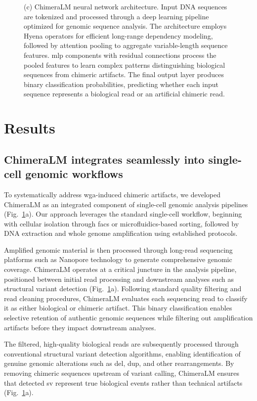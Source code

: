\documentclass[pdflatex,sn-nature]{sn-jnl}%
\theoremstyle{thmstyleone}%
\theoremstyle{thmstyletwo}%
\theoremstyle{thmstylethree}%
\begin{document}
\begin{figure}[!ht]
{		(c) ChimeraLM neural network architecture. Input DNA sequences are tokenized and processed through a deep learning pipeline optimized for genomic sequence analysis. The architecture employs Hyena operators for efficient long-range dependency modeling, followed by attention pooling to aggregate variable-length sequence features. \gls{mlp} components with residual connections process the pooled features to learn complex patterns distinguishing biological sequences from chimeric artifacts. The final output layer produces binary classification probabilities, predicting whether each input sequence represents a biological read or an artificial chimeric read.} \label{fig:figure1}
\end{figure}

\section*{Results}\label{sec:results}

\subsection*{ChimeraLM integrates seamlessly into single-cell genomic workflows}

To systematically address \gls{wga}-induced chimeric artifacts, we developed ChimeraLM as an integrated component of single-cell genomic analysis pipelines (Fig.~\ref{fig:figure1}a).
Our approach leverages the standard single-cell workflow, beginning with cellular isolation through \gls{facs} or microfluidics-based sorting, followed by DNA extraction and whole genome amplification using established protocols.

Amplified genomic material is then processed through long-read sequencing platforms such as Nanopore technology to generate comprehensive genomic coverage.
ChimeraLM operates at a critical juncture in the analysis pipeline, positioned between initial read processing and downstream analyses such as structural variant detection (Fig.~\ref{fig:figure1}a).
Following standard quality filtering and read cleaning procedures, ChimeraLM evaluates each sequencing read to classify it as either biological or chimeric artifact.
This binary classification enables selective retention of authentic genomic sequences while filtering out amplification artifacts before they impact downstream analyses.

The filtered, high-quality biological reads are subsequently processed through conventional structural variant detection algorithms, enabling identification of genuine genomic alterations such as \gls{del}, \gls{dup}, and other rearrangements.
By removing chimeric sequences upstream of variant calling, ChimeraLM ensures that detected \gls{sv} represent true biological events rather than technical artifacts (Fig.~\ref{fig:figure1}a).
\end{document}
